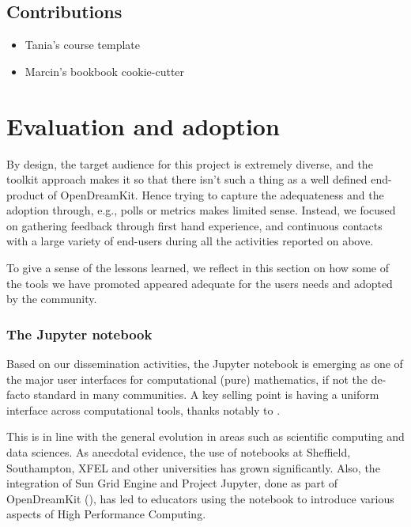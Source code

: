 \documentclass{deliverablereport}
\begin{document}
\subsection{Contributions}



\begin{itemize}
\tightlist
\item
  Tania's course template
\item
  Marcin's bookbook cookie-cutter
\end{itemize}

\section{Evaluation and adoption}

By design, the target audience for this project is extremely diverse,
and the toolkit approach makes it so that there isn't such a thing as
a well defined end-product of OpenDreamKit. Hence trying to capture
the adequateness and the adoption through, e.g., polls or metrics
makes limited sense. Instead, we focused on gathering feedback through
first hand experience, and continuous contacts with a large variety of
end-users during all the activities reported on above.

To give a sense of the lessons learned, we reflect in this section on
how some of the tools we have promoted appeared adequate for the users
needs and adopted by the community.

\subsubsection{The Jupyter notebook}

Based on our dissemination activities, the Jupyter notebook is
emerging as one of the major user interfaces for computational (pure)
mathematics, if not the de-facto standard in many communities. A key
selling point is having a uniform interface across computational
tools, thanks notably to .

This is in line with the general evolution in areas such as scientific
computing and data sciences. As anecdotal evidence, the use of
notebooks at Sheffield, Southampton, XFEL and other universities has
grown significantly. Also, the integration of Sun Grid Engine and
Project Jupyter, done as part of OpenDreamKit
(), has led to educators using the
notebook to introduce various aspects of High Performance Computing.
\end{document}

